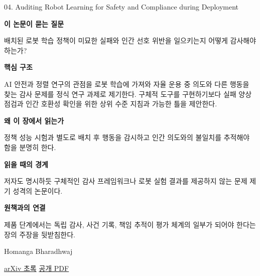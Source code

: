 \documentclass[11pt,openany]{book}
\begin{document}
\begin{termcard}{04. Auditing Robot Learning for Safety and Compliance during Deployment}

\par

\medskip

{\sffamily\bfseries\color{deepblue} 이 논문이 묻는 질문}\par

배치된 로봇 학습 정책이 미묘한 실패와 인간 선호 위반을 일으키는지 어떻게 감사해야 하는가?

\smallskip

{\sffamily\bfseries\color{deepblue} 핵심 구조}\par

AI 안전과 정렬 연구의 관점을 로봇 학습에 가져와 자율 운용 중 의도와 다른 행동을 찾는 감사 문제를 정식 연구 과제로 제기한다. 구체적 도구를 구현하기보다 실패 양상 점검과 인간 호환성 확인을 위한 상위 수준 지침과 가능한 틀을 제안한다.

\smallskip

{\sffamily\bfseries\color{deepblue} 왜 이 장에서 읽는가}\par

정책 성능 시험과 별도로 배치 후 행동을 감시하고 인간 의도와의 불일치를 추적해야 함을 분명히 한다.

\smallskip

{\sffamily\bfseries\color{coral} 읽을 때의 경계}\par

저자도 명시하듯 구체적인 감사 프레임워크나 로봇 실험 결과를 제공하지 않는 문제 제기 성격의 논문이다.

\smallskip

{\sffamily\bfseries\color{teal} 원책과의 연결}\par

제품 단계에서는 독립 감사, 사건 기록, 책임 추적이 평가 체계의 일부가 되어야 한다는 장의 주장을 뒷받침한다.

\medskip

{\footnotesize\color{muted} Homanga Bharadhwaj\par

\href{https://arxiv.org/abs/2110.05702}{arXiv 초록} \quad \href{https://arxiv.org/pdf/2110.05702}{공개 PDF}\par}

\end{termcard}
\end{document}
